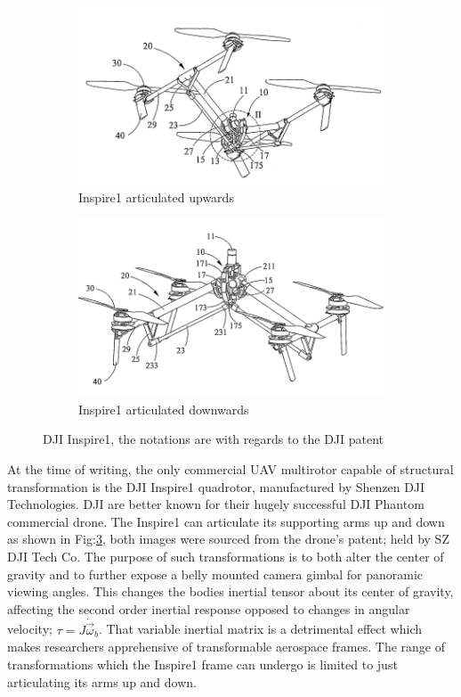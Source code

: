\begin{figure}[hbtp]
\centering
\begin{subfigure}{.5\textwidth}
\centering
\includegraphics[width=\textwidth]{figs/dji-inspire1}
\caption{Inspire1 articulated upwards}
\label{fig:inspireup}
\end{subfigure}%
\begin{subfigure}{.5\textwidth}
\centering
\includegraphics[width=\textwidth]{figs/dji-inspire2}
\caption{Inspire1 articulated downwards}
\label{fig:inspiredown}
\end{subfigure}
\caption{DJI Inspire1, the notations are with regards to the DJI patent}
\label{fig:inspire1}
\end{figure}
At the time of writing, the only commercial UAV multirotor capable of structural transformation is the DJI Inspire1 quadrotor\cite{inspire}, manufactured by Shenzen DJI Technologies. DJI are better known for their hugely successful DJI Phantom commercial drone\cite{phantom}. The Inspire1 can articulate its supporting arms up and down as shown in Fig:\ref{fig:inspire1}, both images were sourced from the drone's patent; held by SZ DJI Tech Co\cite{djinspire}. The purpose of such transformations is to both alter the center of gravity and to further expose a belly mounted camera gimbal for panoramic viewing angles. This changes the bodies inertial tensor about its center of gravity, affecting the second order inertial response opposed to changes in angular velocity; $\tau=J\dot{\vec{\omega}}_b$. That variable inertial matrix is a detrimental effect which makes researchers apprehensive of transformable aerospace frames. The range of transformations which the Inspire1 frame can undergo is limited to just articulating its arms up and down.
